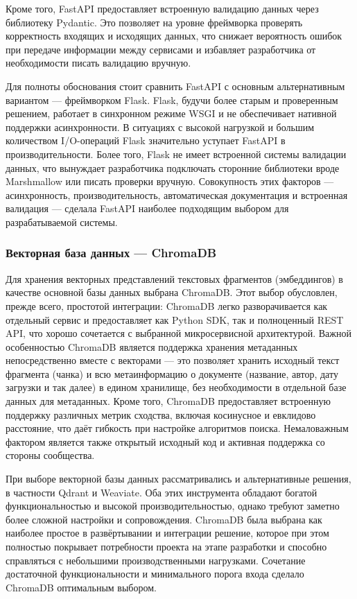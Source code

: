 Кроме того, FastAPI предоставляет встроенную валидацию данных через библиотеку Pydantic. Это позволяет на уровне фреймворка проверять корректность входящих и исходящих данных, что снижает вероятность ошибок при передаче информации между сервисами и избавляет разработчика от необходимости писать валидацию вручную.

Для полноты обоснования стоит сравнить FastAPI с основным альтернативным вариантом — фреймворком Flask. Flask, будучи более старым и проверенным решением, работает в синхронном режиме WSGI и не обеспечивает нативной поддержки асинхронности. В ситуациях с высокой нагрузкой и большим количеством I/O-операций Flask значительно уступает FastAPI в производительности. Более того, Flask не имеет встроенной системы валидации данных, что вынуждает разработчика подключать сторонние библиотеки вроде Marshmallow или писать проверки вручную. Совокупность этих факторов — асинхронность, производительность, автоматическая документация и встроенная валидация — сделала FastAPI наиболее подходящим выбором для разрабатываемой системы.


\subsubsection{Векторная база данных — ChromaDB}

Для хранения векторных представлений текстовых фрагментов (эмбеддингов) в качестве основной базы данных выбрана ChromaDB. Этот выбор обусловлен, прежде всего, простотой интеграции: ChromaDB легко разворачивается как отдельный сервис и предоставляет как Python SDK, так и полноценный REST API, что хорошо сочетается с выбранной микросервисной архитектурой. Важной особенностью ChromaDB является поддержка хранения метаданных непосредственно вместе с векторами — это позволяет хранить исходный текст фрагмента (чанка) и всю метаинформацию о документе (название, автор, дату загрузки и так далее) в едином хранилище, без необходимости в отдельной базе данных для метаданных. Кроме того, ChromaDB предоставляет встроенную поддержку различных метрик сходства, включая косинусное и евклидово расстояние, что даёт гибкость при настройке алгоритмов поиска. Немаловажным фактором является также открытый исходный код и активная поддержка со стороны сообщества.

При выборе векторной базы данных рассматривались и альтернативные решения, в частности Qdrant и Weaviate. Оба этих инструмента обладают богатой функциональностью и высокой производительностью, однако требуют заметно более сложной настройки и сопровождения. ChromaDB была выбрана как наиболее простое в развёртывании и интеграции решение, которое при этом полностью покрывает потребности проекта на этапе разработки и способно справляться с небольшими производственными нагрузками. Сочетание достаточной функциональности и минимального порога входа сделало ChromaDB оптимальным выбором.

